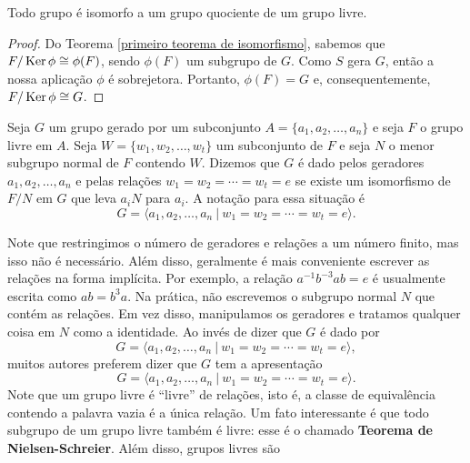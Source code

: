	\begin{corollary}
	\label{iso grupo quociente}
		Todo grupo é isomorfo a um grupo quociente de um grupo livre.
	\end{corollary}
	\begin{proof}
		Do Teorema \ref{primeiro teorema de isomorfismo}, sabemos que $F/\operatorname{Ker}\phi\cong \phi(F)$, 
		sendo $\phi(F)$ um subgrupo de $G$. Como $S$ gera $G$, então a nossa aplicação $\phi$ é sobrejetora.
		Portanto, $\phi(F) = G$ e, consequentemente, $F/\operatorname{Ker}\phi\cong G$.
	\end{proof}
	\begin{definition}
		Seja $G$ um grupo gerado por um subconjunto $A = \{ a_1, a_2, \dots, a_n \}$ e seja 
		$F$ o grupo livre em $A$. Seja $W = \{ w_1, w_2, \dots, w_t \}$ um subconjunto de $F$ e seja 
		$N$ o menor subgrupo normal de $F$ contendo $W$. Dizemos que $G$ é dado pelos geradores 
		$a_1, a_2, \dots, a_n$ e pelas relações $w_1 = w_2 = \cdots = w_t = e$ se existe um isomorfismo 
		de $F/N$ em $G$ que leva $a_iN$ para $a_i$. A notação para essa situação é
    	\begin{equation*}
    	    G = \langle a_1, a_2, \dots, a_n \ | \ w_1 = w_2 = \cdots = w_t = e \rangle.
    	\end{equation*}
	\end{definition}
	Note que restringimos o número de geradores e relações a um número finito, 
	mas isso não é necessário. Além disso, geralmente é mais conveniente escrever as relações na 
	forma implícita. Por exemplo, a relação $a^{-1}b^{-3}ab = e$ é usualmente escrita como $ab = b^3a$.
	Na prática, não escrevemos o subgrupo normal $N$ que contém as relações. Em vez disso, manipulamos os
	geradores e tratamos qualquer coisa em $N$ como a identidade. Ao invés de dizer que $G$ é dado por  
	\begin{equation*}
	    G = \langle a_1, a_2, \dots, a_n \ | \ w_1 = w_2 = \cdots = w_t = e \rangle,
	\end{equation*}
	muitos autores preferem dizer que $G$ tem a apresentação
	\begin{equation*}
	    G = \langle a_1, a_2, \dots, a_n \ | \ w_1 = w_2 = \cdots = w_t = e \rangle.
	\end{equation*}
	Note que um grupo livre é ``livre'' de relações, isto é, a classe de equivalência 
	contendo a palavra vazia é a única relação. Um fato interessante é que todo subgrupo de um grupo livre 
	também é livre: esse é o chamado \textbf{Teorema de Nielsen-Schreier}. Além disso, grupos livres são
